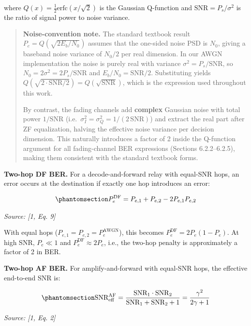where \(Q(x) = \frac{1}{2}\text{erfc}(x/\sqrt{2})\) is the Gaussian Q-function and \(\text{SNR} = P_s / \sigma^2\) is the ratio of signal power to noise variance.

\begin{quote}
\textbf{Noise-convention note.} The standard textbook result \(P_e = Q(\sqrt{2 E_b/N_0})\) assumes that the one-sided noise PSD is \(N_0\), giving a baseband noise variance of \(N_0/2\) per real dimension. In our AWGN implementation the noise is purely real with variance \(\sigma^2 = P_s/\text{SNR}\), so \(N_0 = 2\sigma^2 = 2P_s/\text{SNR}\) and \(E_b/N_0 = \text{SNR}/2\). Substituting yields \(Q(\sqrt{2 \cdot \text{SNR}/2}) = Q(\sqrt{\text{SNR}})\), which is the expression used throughout this work.

By contrast, the fading channels add \textbf{complex} Gaussian noise with total power \(1/\text{SNR}\) (i.e.~\(\sigma_I^2 = \sigma_Q^2 = 1/(2\,\text{SNR})\)) and extract the real part after ZF equalization, halving the effective noise variance per decision dimension. This naturally introduces a factor of 2 inside the Q-function argument for all fading-channel BER expressions (Sections 6.2.2--6.2.5), making them consistent with the standard textbook forms.
\end{quote}

\textbf{Two-hop DF BER.} For a decode-and-forward relay with equal-SNR hops, an error occurs at the destination if exactly one hop introduces an error:

\begin{equation}\protect\phantomsection\label{eq:df-ber-awgn}{P_e^{\text{DF}} = P_{e,1} + P_{e,2} - 2P_{e,1}P_{e,2}
}\end{equation} \par{\small\textit{Source: [1, Eq. 9]}}

With equal hops (\(P_{e,1} = P_{e,2} = P_e^{\text{AWGN}}\)), this becomes \(P_e^{\text{DF}} = 2P_e(1 - P_e)\). At high SNR, \(P_e \ll 1\) and \(P_e^{\text{DF}} \approx 2P_e\), i.e., the two-hop penalty is approximately a factor of 2 in BER.

\textbf{Two-hop AF BER.} For amplify-and-forward with equal-SNR hops, the effective end-to-end SNR is:

\begin{equation}\protect\phantomsection\label{eq:af-snr-eff}{\text{SNR}_{\text{eff}}^{\text{AF}} = \frac{\text{SNR}_1 \cdot \text{SNR}_2}{\text{SNR}_1 + \text{SNR}_2 + 1} = \frac{\gamma^2}{2\gamma + 1}
}\end{equation} \par{\small\textit{Source: [1, Eq. 2]}}

